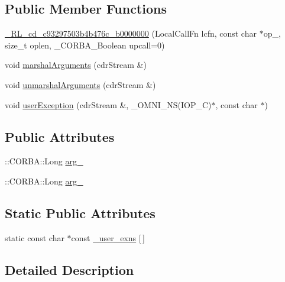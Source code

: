\subsection*{Public Member Functions}
\begin{DoxyCompactItemize}
\item 
\hyperlink{class__0_r_l__cd__c93297503b4b476c__b0000000_ac1cdd4fa506f30d39864cc6494deffc7}{\+\_\+R\+L\+\_\+cd\+\_\+c93297503b4b476c\+\_\+b0000000} (Local\+Call\+Fn lcfn, const char $\ast$op\+\_\+, size\+\_\+t oplen, \+\_\+\+C\+O\+R\+B\+A\+\_\+\+Boolean upcall=0)
\item 
void \hyperlink{class__0_r_l__cd__c93297503b4b476c__b0000000_a5226a30e633968374c01cfb591480fde}{marshal\+Arguments} (cdr\+Stream \&)
\item 
void \hyperlink{class__0_r_l__cd__c93297503b4b476c__b0000000_a190389d98b14853f4e10da3b7c7dbce6}{unmarshal\+Arguments} (cdr\+Stream \&)
\item 
void \hyperlink{class__0_r_l__cd__c93297503b4b476c__b0000000_a0f138774eeeb7ecad8f9d98186941e2c}{user\+Exception} (cdr\+Stream \&, \+\_\+\+O\+M\+N\+I\+\_\+\+NS(I\+O\+P\+\_\+C)$\ast$, const char $\ast$)
\end{DoxyCompactItemize}
\subsection*{Public Attributes}
\begin{DoxyCompactItemize}
\item 
\+::C\+O\+R\+B\+A\+::\+Long \hyperlink{class__0_r_l__cd__c93297503b4b476c__b0000000_ae90df0f02cbdd0ef4f1add610ebd2118}{arg\+\_}
\item 
\+::C\+O\+R\+B\+A\+::\+Long \hyperlink{class__0_r_l__cd__c93297503b4b476c__b0000000_a02271bbb9282eb05747774e2e14e7ffb}{arg\+\_}
\end{DoxyCompactItemize}
\subsection*{Static Public Attributes}
\begin{DoxyCompactItemize}
\item 
static const char $\ast$const \hyperlink{class__0_r_l__cd__c93297503b4b476c__b0000000_a03a219aaf4b2d7bcc60274a72583f9d8}{\+\_\+user\+\_\+exns} \mbox{[}$\,$\mbox{]}
\end{DoxyCompactItemize}


\subsection{Detailed Description}


